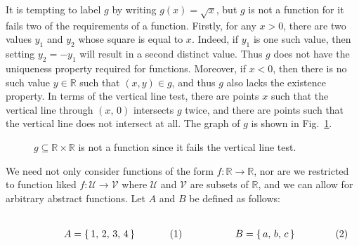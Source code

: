         It is tempting to label $g$ by writing $g(x)=\sqrt{x}$, but $g$ is
        not a function for it fails two of the requirements of a function.
        Firstly, for any $x>0$, there are two values $y_{1}$ and $y_{2}$
        whose square is equal to $x$. Indeed, if $y_{1}$ is one such value,
        then setting $y_{2}=\minus{y}_{1}$ will result in a second
        distinct value. Thus $g$ does not have the uniqueness property
        required for functions. Moreover, if $x<0$, then there is no such
        value $y\in\mathbb{R}$ such that $(x,y)\in{g}$, and thus $g$ also
        lacks the existence property. In terms of the vertical line test,
        there are points $x$ such that the vertical line through
        $(x,\,0)$ intersects $g$ twice, and there are points such that the
        vertical line does not intersect at all. The graph of $g$ is shown
        in Fig.~\ref{fig:SQRT_Not_a_Function}.
        \begin{figure}[H]
            \centering
            
            \caption[Example of a Non-Function]
                {$g\subseteq\mathbb{R}\times\mathbb{R}$ is not a function
                 since it fails the vertical line test.}
            \label{fig:SQRT_Not_a_Function}
        \end{figure}
        We need not only consider functions of the form
        $f:\mathbb{R}\rightarrow\mathbb{R}$, nor are we restricted to function
        liked $f:\mathcal{U}\rightarrow\mathcal{V}$ where $\mathcal{U}$ and
        $\mathcal{V}$ are subsets of $\mathbb{R}$, and we can allow for
        arbitrary abstract functions. Let $A$ and $B$ be defined as follows:
        \par
        \begin{subequations}
            \begin{minipage}[b]{0.49\textwidth}
                \centering
                \begin{equation}
                    A=\{\,1,\,2,\,3,\,4\,\}
                \end{equation}
            \end{minipage}
            \hfill
            \begin{minipage}[b]{0.49\textwidth}
                \centering
                \begin{equation}
                    B=\{\,a,\,b,\,c\,\}
                \end{equation}
            \end{minipage}
        \end{subequations}
